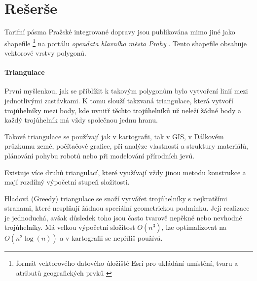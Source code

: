 \chapter{Rešerše}
\label{0-reserse}

Tarifní pásma Pražské integrované dopravy jsou publikována mimo jiné jako shapefile 
\footnote{formát vektorového datového úložiště Esri pro ukládání umístění,
  tvaru a atributů geografic\-kých prvků \cite{shapefile}}
na portálu \textit{opendata hlavního města Prahy} \cite{opendata}. Tento shapefile
obsahuje vektorové vrstvy polygonů.

\subsubsection{Triangulace}
\label{triangulace}

První myšlenkou, jak se přiblížit k takovým polygonům bylo vytvoření linií mezi jednotlivými zastávkami.
K tomu slouží takzvaná triangulace, která vytvoří troj\-úhelníky mezi body, kde uvnitř těchto trojúhelníků  
už neleží žádné body a každý trojúhelník má vždy společnou jednu hranu. 

Takové triangulace se používají jak v kartografii, tak v GIS, v Dálkovém průzkumu země,
počítačové grafice, při analýze vlastností a struktury materiálů, plánování pohybu robotů
nebo při modelování přírodních jevů. \cite{bayer-delaunay}

Existuje více druhů triangulací, které využívají vždy jinou metodu konstrukce
a mají rozdílný výpočetní stupeň složitosti. 

Hladová (Greedy) triangulace se snaží vytvářet trojúhelníky s nejkratšími stranami,
které nesplňují žádnou speciální geometrickou podmínku. Její realizace je jednoduchá,
avšak důsledek toho jsou často tvarově nepěkné nebo nevhodné trojúhelníky. Má velkou výpočetní
složitost \(O(n^3)\), lze optimalizovat na \(O(n^2 \log(n))\) a v kartografii se
nepříliš používá. \cite{vanicek}

